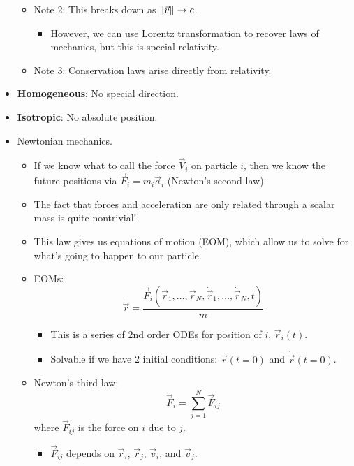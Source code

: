 \documentclass[../notes.tex]{subfiles}
\begin{document}
\begin{itemize}
\begin{itemize}
\begin{itemize}
        \end{itemize}
        \item Note 2: This breaks down as $\norm{\vec{v}}\to c$.
        \begin{itemize}
            \item However, we can use Lorentz transformation to recover laws of mechanics, but this is special relativity.
        \end{itemize}
        \item Note 3: Conservation laws arise directly from relativity.
    \end{itemize}
    \item \textbf{Homogeneous}: No special direction.
    \item \textbf{Isotropic}: No absolute position.
    \item Newtonian mechanics.
    \begin{itemize}
        \item If we know what to call the force $\vec{V}_i$ on particle $i$, then we know the future positions via $\vec{F}_i=m_i\vec{a}_i$ (Newton's second law).
        \item The fact that forces and acceleration are only related through a scalar mass is quite nontrivial!
        \item This law gives us equations of motion (EOM), which allow us to solve for what's going to happen to our particle.
        \item EOMs:
        \begin{equation*}
            \ddot{\vec{r}} = \frac{\vec{F}_i(\vec{r}_1,\dots,\vec{r}_N,\dot{\vec{r}}_1,\dots,\dot{\vec{r}}_N,t)}{m}
        \end{equation*}
        \begin{itemize}
            \item This is a series of 2nd order ODEs for position of $i$, $\vec{r}_i(t)$.
            \item Solvable if we have 2 initial conditions: $\vec{r}(t=0)$ and $\dot{\vec{r}}(t=0)$.
        \end{itemize}
        \item Newton's third law:
        \begin{equation*}
            \vec{F}_i = \sum_{j=1}^N\vec{F}_{ij}
        \end{equation*}
        where $\vec{F}_{ij}$ is the force on $i$ due to $j$.
        \begin{itemize}
            \item $\vec{F}_{ij}$ depends on $\vec{r}_i$, $\vec{r}_j$, $\vec{v}_i$, and $\vec{v}_j$.

\end{itemize}
\end{itemize}
\end{itemize}
\end{document}
